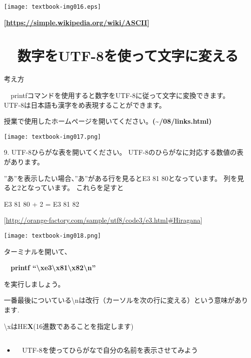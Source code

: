 \begin{center}
  \texttt{[image: textbook-img016.eps]}
\end{center}

{\bfseries
[\url{https://simple.wikipedia.org/wiki/ASCII}]}

\clearpage
\section{\theExercise　数字をUTF-8を使って文字に変える}
\addtocounter{Exercise}{-1}\label{E:UTF8}
\noindent 考え方

\ \ printfコマンドを使用すると数字をUTF-8に従って文字に変換できます。
UTF-8は日本語も漢字をめ表現することができます。

授業で使用したホームページを開いてください。\textbf{({\textasciitilde}/08/links.html)}

\begin{center}
  \texttt{[image: textbook-img017.png]}
\end{center}


9.
UTF-8ひらがな表を開いてください。
UTF-8のひらがなに対応する数値の表があります。

”あ”を表示したい場合、”あ”がある行を見るとE3
81
80となっています。
列を見ると2となっています。
これらを足すと

E3 81 80 + 2 = E3 81 82

[\url{http://orange-factory.com/sample/utf8/code3/e3.html#Hiragana}]

\begin{center}
  \texttt{[image: textbook-img018.png]}
\end{center}
ターミナルを開いて、

\ \ \textbf{printf “{\textbackslash}xe3{\textbackslash}x81{\textbackslash}x82{\textbackslash}n”}

を実行しましょう。

一番最後についている{\textbackslash}nは改行（カーソルを次の行に変える）という意味があります.

{\textbackslash}xはHE\textbf{X}(16進数であることを指定します)

\subsection*{\theQuestion\label{Q:myNameUTF8}}
\begin{itemize}
  \item　UTF-8を使ってひらがなで自分の名前を表示させてみよう
\end{itemize}

